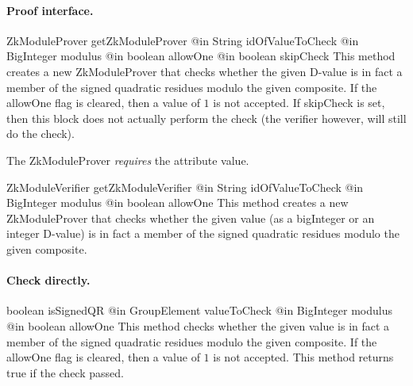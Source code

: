     \paragraph{Proof interface.}
      \begin{method}
      {ZkModuleProver}
      {getZkModuleProver}
      {
        {@in String idOfValueToCheck}
        {@in BigInteger modulus}
        {@in boolean allowOne}
        {@in boolean skipCheck}
      }
      This method creates a new ZkModuleProver that checks whether the given
      D-value is in fact a member of
      the signed quadratic residues modulo the given composite.
      If the allowOne flag is cleared, then a value of $1$ is not accepted.
      If skipCheck is set, then this block does not actually perform the check
      (the verifier however, will still do the check).

      The ZkModuleProver \emph{requires} the attribute value.

      \end{method}
      \begin{method}
      {ZkModuleVerifier}
      {getZkModuleVerifier}
      {
        {@in String idOfValueToCheck}
        {@in BigInteger modulus}
        {@in boolean allowOne}
      }
      This method creates a new ZkModuleProver that checks whether the given
      value (as a bigInteger or an integer D-value) is in fact a member of
      the signed quadratic residues modulo the given composite.
      \end{method}
    \paragraph{Check directly.}
      \begin{method}
      {boolean}
      {isSignedQR}
      {
        {@in GroupElement valueToCheck}
        {@in BigInteger modulus}
        {@in boolean allowOne}
      }
      This method checks whether the given
      value is in fact a member of
      the signed quadratic residues modulo the given composite.
      If the allowOne flag is cleared, then a value of $1$ is not accepted.
      This method returns true if the check passed.
      \end{method}
\fi
